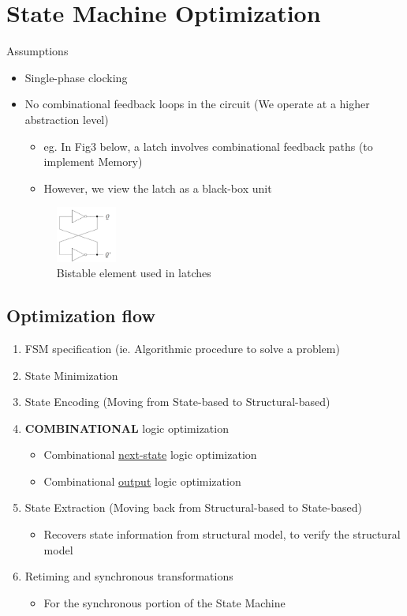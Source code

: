\documentclass{article}
\begin{document}
\newpage

\section{State Machine Optimization}
Assumptions
\begin{itemize}
    \item Single-phase clocking
    \item No combinational feedback loops in the circuit (We operate at a higher abstraction level)
        \begin{itemize}
            \item eg. In Fig3 below, a latch involves combinational feedback paths (to implement Memory)
            \item However, we view the latch as a black-box unit
        \end{itemize}
        \begin{figure}[htp]
            \centering
            \includegraphics[width=2cm, scale=1]{S2/bistableElement.PNG}
            \caption{Bistable element used in latches}
        \end{figure}
\end{itemize}

\subsection{Optimization flow}
\begin{enumerate}
    \item FSM specification (ie. Algorithmic procedure to solve a problem)
    \item State Minimization
    \item State Encoding (Moving from State-based to Structural-based)
    \item \textbf{COMBINATIONAL} logic optimization
        \begin{itemize}
            \item Combinational \underline{next-state} logic optimization
            \item Combinational \underline{output} logic optimization
        \end{itemize}
    \item State Extraction (Moving back from Structural-based to State-based)
        \begin{itemize}
            \item Recovers state information from structural model, to verify the structural model
        \end{itemize}
    \item Retiming and synchronous transformations
        \begin{itemize}
            \item For the synchronous portion of the State Machine
        \end{itemize}
\end{enumerate}
\end{document}
